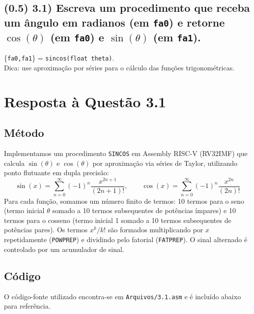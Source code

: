 \documentclass[12pt,a4paper]{article}
\begin{document}
\subsection*{(0.5) 3.1) Escreva um procedimento que receba um ângulo em radianos (em \texttt{fa0}) e retorne $\cos(\theta)$ (em \texttt{fa0}) e $\sin(\theta)$ (em \texttt{fa1}).}

\{\texttt{fa0,fa1}\} = \texttt{sincos(float theta)}. \\
Dica: use aproximação por séries para o cálculo das funções trigonométricas.

\section*{Resposta à Questão 3.1}

\subsection*{Método}
Implementamos um procedimento \texttt{SINCOS} em Assembly RISC-V (RV32IMF) que calcula $\sin(\theta)$ e $\cos(\theta)$ por aproximação via séries de Taylor, utilizando ponto flutuante em dupla precisão:
\[
\sin(x) = \sum_{n=0}^{\infty} (-1)^n \frac{x^{2n+1}}{(2n+1)!},\qquad
\cos(x) = \sum_{n=0}^{\infty} (-1)^n \frac{x^{2n}}{(2n)!}
\]
Para cada função, somamos um número finito de termos: 10 termos para o seno (termo inicial $\theta$ somado a 10 termos subsequentes de potências ímpares) e 10 termos para o cosseno (termo inicial 1 somado a 10 termos subsequentes de potências pares). Os termos \(x^k/k!\) são formados multiplicando por \(x\) repetidamente (\texttt{POWPREP}) e dividindo pelo fatorial (\texttt{FATPREP}). O sinal alternado é controlado por um acumulador de sinal.

\subsection*{Código}
O código-fonte utilizado encontra-se em \texttt{Arquivos/3.1.asm} e é incluído abaixo para referência.
\end{document}
